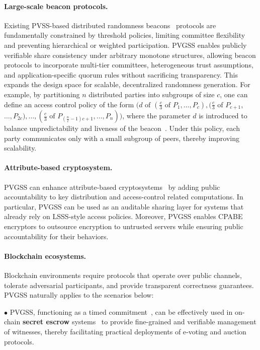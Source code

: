 \documentclass[runningheads]{llncs}
\begin{document}
\paragraph{Large-scale beacon protocols.}
Existing PVSS-based distributed randomness beacons~\cite{Choi2023Beacon} protocols are fundamentally constrained by threshold policies, limiting committee flexibility and preventing hierarchical or weighted participation. PVGSS enables publicly verifiable share consistency under arbitrary monotone structures, allowing beacon protocols to incorporate multi-tier committees, heterogeneous trust assumptions, and application-specific quorum rules without sacrificing transparency. This expands the design space for scalable, decentralized randomness generation.
For example, by partitioning $n$ distributed parties into subgroups of size $c$, one can define an access control policy of the form
$(d \text{ of } (\frac{c}{3} \text{ of } P_1,\ldots,P_c), (\frac{c}{3} \text{ of } P_{c+1}$, $\ldots,P_{2c}), \ldots, (\frac{c}{3} \text{ of } P_{(\frac{n}{c}-1)c+1},\ldots,P_n))$, where the parameter $d$ is introduced to balance unpredictability and liveness of the beacon~\cite{Syta2017Beacon,Schindler2020Beacon}. Under this policy, each party communicates only with a small subgroup of peers, thereby improving scalability.


\paragraph{Attribute-based cryptosystem.} PVGSS can enhance attribute-based cryptosystems~\cite{Bethencourt2007CPABE,Lewko2011DABE} by adding public accountability to key distribution and access-control related computations. In particular, PVGSS can be used as an auditable sharing layer for systems that already rely on LSSS-style access policies. Moreover, PVGSS enables CPABE encryptors to outsource encryption to untrusted servers while ensuring public accountability for their behaviors.




\paragraph{Blockchain ecosystems.}
Blockchain environments require protocols that operate over public channels, tolerate adversarial participants, and provide transparent correctness guarantees. PVGSS naturally applies to the scenarios below:

$\bullet$ PVGSS, functioning as a timed commitment~\cite{tyagi2023riggs}, can be effectively used in on-chain \textbf{secret escrow} systems~\cite{Benhamouda2020Secret,Goyal2022Secret,Cerulli2023Secret} to provide fine-grained and verifiable management of witnesses, thereby facilitating practical deployments of e‑voting and auction protocols.
\end{document}
